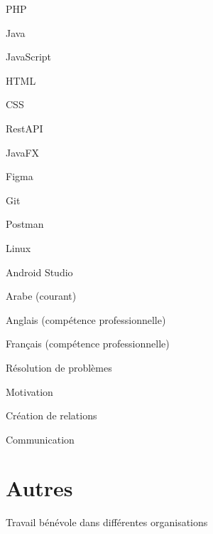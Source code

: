 \documentclass[]{deedy-resume-openfont}
\begin{document}
\begin{enumerate*}
  \item[]  PHP
  \item[]  Java
  \item[]  JavaScript
  \item[]  HTML
  \item[]  CSS
  \item[]  RestAPI
\end{enumerate*}
\linebreak
\linebreak

\begin{enumerate*}
  \item[]  JavaFX
  \item[]  Figma
  \item[]  Git
  \item[]  Postman
  \item[]  Linux
  \item[]  Android Studio
\end{enumerate*}
\linebreak
\linebreak

\begin{enumerate*}
  \item[]  Arabe (courant)
  \item[]  Anglais (compétence professionnelle)
  \item[]  Français (compétence professionnelle)
\end{enumerate*}
\linebreak
\linebreak

\begin{enumerate*}
  \item[]  Résolution de problèmes  
  \item[]  Motivation 
  \item[]  Création de relations 
  \item[]  Communication
\end{enumerate*}

%
%
\section{Autres}
Travail bénévole dans différentes organisations\\
\sectionsep
\ 
\end{document}
